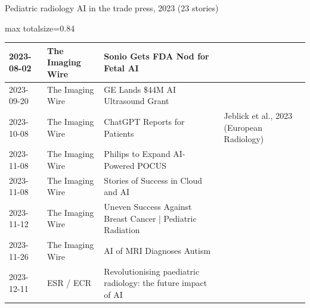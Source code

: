 \documentclass[aspectratio=169]{beamer}
\begin{document}
\begin{frame}[category=Newsletters]{Pediatric radiology AI in the trade press, 2023 (23 stories)}
\begin{adjustbox}{max totalsize={\textwidth}{0.84\textheight}}
\begin{tabular}{|l|l|>{\raggedright\arraybackslash}p{}|>{\raggedright\arraybackslash}p{}|}
2023-08-02 & The Imaging Wire & Sonio Gets FDA Nod for Fetal AI &  \\ \hline
2023-09-20 & The Imaging Wire & GE Lands \$44M AI Ultrasound Grant &  \\ \hline
2023-10-08 & The Imaging Wire & ChatGPT Reports for Patients & Jeblick et al., 2023 (European Radiology) \\ \hline
2023-11-08 & The Imaging Wire & Philips to Expand AI-Powered POCUS &  \\ \hline
2023-11-08 & The Imaging Wire & Stories of Success in Cloud and AI &  \\ \hline
2023-11-12 & The Imaging Wire & Uneven Success Against Breast Cancer | Pediatric Radiation &  \\ \hline
2023-11-26 & The Imaging Wire & AI of MRI Diagnoses Autism &  \\ \hline
2023-12-11 & ESR / ECR & Revolutionising paediatric radiology: the future impact of AI &  \\ \hline
\end{tabular}
\end{adjustbox}
\end{frame}
\end{document}
